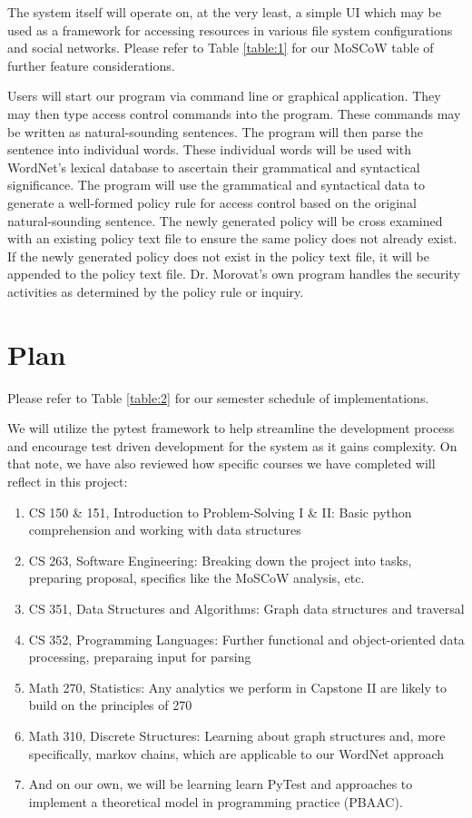 \documentclass[12pt]{article}
\begin{document}
The system itself will operate on, at the very least, a simple UI which may be used as a framework for accessing resources in various file system configurations and social networks. Please refer to Table \ref{table:1} for our MoSCoW table of further feature considerations.

Users will start our program via command line or graphical application. They may then type access control commands into the program. These commands may be written as natural-sounding sentences. The program will then parse the sentence into individual words. These individual words will be used with WordNet’s lexical database to ascertain their grammatical and syntactical significance. The program will use the grammatical and syntactical data to generate a well-formed policy rule for access control based on the original natural-sounding sentence. The newly generated policy will be cross examined with an existing policy text file to ensure the same policy does not already exist. If the newly generated policy does not exist in the policy text file, it will be appended to the policy text file. Dr. Morovat’s own program handles the security activities as determined by the policy rule or inquiry.

\section{Plan}

Please refer to Table \ref{table:2} for our semester schedule of implementations.

We will utilize the pytest framework to help streamline the development process and encourage test driven development for the system as it gains complexity. On that note, we have also reviewed how specific courses we have completed will reflect in this project:
\begin{enumerate}
    \item CS 150 \& 151, Introduction to Problem-Solving I \& II: Basic python comprehension and working with data structures
    \item CS 263, Software Engineering: Breaking down the project into tasks, preparing proposal, specifics like the MoSCoW analysis, etc.
    \item CS 351, Data Structures and Algorithms: Graph data structures and traversal
    \item CS 352, Programming Languages: Further functional and object-oriented data processing, preparaing input for parsing
    \item Math 270, Statistics: Any analytics we perform in Capstone II are likely to build on the principles of 270
    \item Math 310, Discrete Structures: Learning about graph structures and, more specifically, markov chains, which are applicable to our WordNet approach
    \item And on our own, we will be learning learn PyTest and approaches to implement a theoretical model in programming practice (PBAAC).
\end{enumerate}
\end{document}
